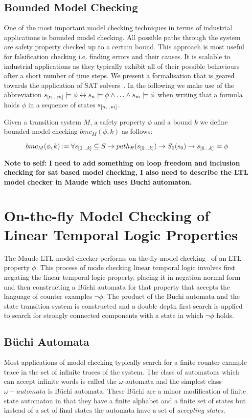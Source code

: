 \subsection*{Bounded Model Checking}
One of the most important model checking techniques in terms of industrial applications is bounded model checking. All possible paths through the system are safety property checked up to a certain bound. This approach is most useful for falsification checking i.e. finding errors and their causes. It is scalable to industrial applications as they typically exhibit all of their possible behaviours after a short number of time steps. We present a formalisation that is geared towards the application of SAT solvers~\cite{EC01}. In the following we make use of the abbreviation $s_{{[}n \ldots m {]}} \models \phi \leftrightarrow s_n \models \phi \wedge \ldots \wedge  s_m \models \phi$ when writing that a formula holds $\phi$ in a sequence of states $s_{{[}n \ldots m {]}}$.
\medskip
\begin{mydef}
Given a transition system $M$, a safety property $\phi$ and a bound $k$ we define bounded model checking $bmc_M(\phi,k)$ as follows:

$$bmc_M(\phi,k):= \forall s_{{[}0 \ldots k {]}} \subseteq S \to  path_R(s_{{[}0 \ldots k {]}}) \to S_0(s_0) \to s_{{[}0 \ldots k {]}} \models \phi$$
\end{mydef}
\medskip
\textbf{Note to self: I need to add something on loop freedom and inclusion checking for sat based model checking, I also need to describe the LTL model checker in Maude which uses Buchi automaton.}  

\section{On-the-fly Model Checking of Linear Temporal Logic Properties}
The Maude LTL model checker performs on-the-fly model checking~\cite{CC91} of an LTL property $\phi$.
This process of mode checking linear temporal logic involves first  negating the linear temporal  logic property, placing it in negation normal form and then constructing a B{\"u}chi automata for that property that accepts the language of counter examples $\neg \phi$. The product of the Buchi automata and the state transition system is constructed and a double depth first search is applied to search for strongly connected components with a state in which $\neg \phi$ holds.

\subsection{B{\"u}chi Automata}
\newcommand{\Buchi}{B{\"u}chi\xspace}
Most applications of model checking typically search for a finite counter example trace in the set of infinite traces of the system. The class of automatons which can accept infinite words is called the $\omega$-automata and the simplest class $\omega-automata$ is \Buchi automata. These \Buchi are a minor modification of finite state automaton in that they have a finite alphabet and a finite set of states but instead of a set of final states the automata have a set of \emph{accepting states}.

